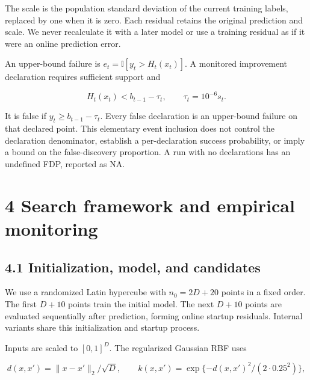 \documentclass[11pt,a4paper]{article}
\begin{document}
The scale is the population standard deviation of the current training
labels, replaced by one when it is zero. Each residual retains the
original prediction and scale. We never recalculate it with a later
model or use a training residual as if it were an online prediction
error.

\par\noindent\begin{minipage}{\linewidth}

An upper-bound failure is \(e_t=\mathbb I[y_t>H_t(x_t)]\). A monitored
improvement declaration requires sufficient support and

\[H_t(x_t)<b_{t-1}-\tau_t,\qquad\tau_t=10^{-6}s_t.\]

\end{minipage}\par

It is false if \(y_t\ge b_{t-1}-\tau_t\). Every false declaration is an
upper-bound failure on that declared point. This elementary event
inclusion does not control the declaration denominator, establish a
per-declaration success probability, or imply a bound on the
false-discovery proportion. A run with no declarations has an undefined
FDP, reported as NA.

\hypertarget{search-framework-and-empirical-monitoring}{%
\section{4 Search framework and empirical
monitoring}\label{search-framework-and-empirical-monitoring}}

\hypertarget{initialization-model-and-candidates}{%
\subsection{4.1 Initialization, model, and
candidates}\label{initialization-model-and-candidates}}

We use a randomized Latin hypercube with \(n_0=2D+20\) points in a fixed
order. The first \(D+10\) points train the initial model. The next
\(D+10\) points are evaluated sequentially after prediction, forming
online startup residuals. Internal variants share this initialization
and startup process.

\par\noindent\begin{minipage}{\linewidth}

Inputs are scaled to \([0,1]^D\). The regularized Gaussian RBF uses

\[d(x,x')=\|x-x'\|_2/\sqrt D,\qquad k(x,x')=\exp\{-d(x,x')^2/(2\cdot0.25^2)\},\]

\end{minipage}\par
\end{document}
